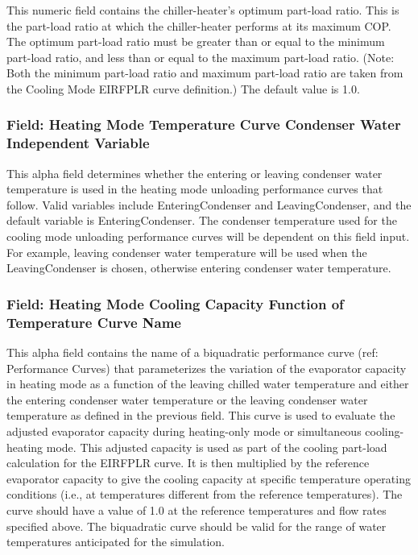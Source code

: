 This numeric field contains the chiller-heater's optimum part-load ratio. This is the part-load ratio at which the chiller-heater performs at its maximum COP. The optimum part-load ratio must be greater than or equal to the minimum part-load ratio, and less than or equal to the maximum part-load ratio. (Note: Both the minimum part-load ratio and maximum part-load ratio are taken from the Cooling Mode EIRFPLR curve definition.) The default value is 1.0.

\subsubsection{Field: Heating Mode Temperature Curve Condenser Water Independent Variable}\label{field-heating-mode-temperature-curve-condenser-water-independent-variable}

This alpha field determines whether the entering or leaving condenser water temperature is used in the heating mode unloading performance curves that follow. Valid variables include EnteringCondenser and LeavingCondenser, and the default variable is EnteringCondenser. The condenser temperature used for the cooling mode unloading performance curves will be dependent on this field input. For example, leaving condenser water temperature will be used when the LeavingCondenser is chosen, otherwise entering condenser water temperature.

\subsubsection{Field: Heating Mode Cooling Capacity Function of Temperature Curve Name}\label{field-heating-mode-cooling-capacity-function-of-temperature-curve-name}

This alpha field contains the name of a biquadratic performance curve (ref: Performance Curves) that parameterizes the variation of the evaporator capacity in heating mode as a function of the leaving chilled water temperature and either the entering condenser water temperature or the leaving condenser water temperature as defined in the previous field. This curve is used to evaluate the adjusted evaporator capacity during heating-only mode or simultaneous cooling-heating mode. This adjusted capacity is used as part of the cooling part-load calculation for the EIRFPLR curve. It is then multiplied by the reference evaporator capacity to give the cooling capacity at specific temperature operating conditions (i.e., at temperatures different from the reference temperatures). The curve should have a value of 1.0 at the reference temperatures and flow rates specified above. The biquadratic curve should be valid for the range of water temperatures anticipated for the simulation.

